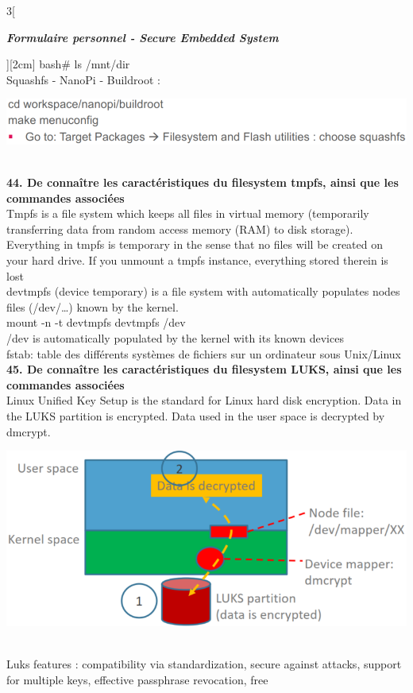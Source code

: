 \begin{multicols}{3}[\centerline{ \large\em \textbf{Formulaire personnel - Secure Embedded System}}][2cm]
bash\# ls /mnt/dir\\
Squashfs - NanoPi - Buildroot : \\
\begin{minipage}{\linewidth}
	\centering
    \includegraphics[width =\columnwidth]{images/32.png}
\end{minipage}
\\ \textbf{44. De connaître les caractéristiques du filesystem tmpfs, ainsi que les commandes associées\\}
Tmpfs is a file system which keeps all files in virtual memory (temporarily transferring data from random access memory (RAM) to disk storage).\\
Everything in tmpfs is temporary in the sense that no files will be created on
your hard drive. If you unmount a tmpfs instance, everything stored therein
is lost\\
devtmpfs (device temporary) is a file system with automatically populates nodes files (/dev/…) known by the kernel. \\
 mount -n -t devtmpfs devtmpfs /dev\\
/dev is automatically populated by the kernel with its known devices\\
fstab: table des différents systèmes de fichiers sur un ordinateur sous Unix/Linux
\\ \textbf{45. De connaître les caractéristiques du filesystem LUKS, ainsi que les commandes associées\\}
Linux Unified Key Setup is the standard for Linux hard disk encryption. Data in the LUKS partition is encrypted. Data used in the user space is decrypted by dmcrypt.\\
\begin{minipage}{\linewidth}
	\centering
    \includegraphics[width =0.6\columnwidth]{images/33.png}
\end{minipage}\\
Luks features : compatibility via standardization, secure against attacks, support for multiple keys, effective passphrase revocation, free\\

\end{multicols}
